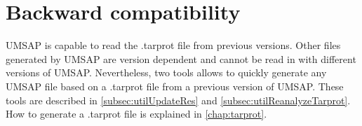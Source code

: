 \section{Backward compatibility}
\label{sec:backwardCompatibility}

UMSAP is capable to read the .tarprot file from previous versions. Other files generated by UMSAP are version dependent and cannot be read in with different versions of UMSAP. Nevertheless, two tools allows to quickly generate any UMSAP file based on a .tarprot file from a previous version of UMSAP. These tools are described in \autoref{subsec:utilUpdateRes} and \autoref{subsec:utilReanalyzeTarprot}. How to generate a .tarprot file is explained in \autoref{chap:tarprot}.